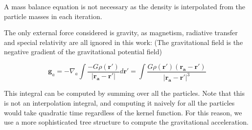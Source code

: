 \documentclass[../main.tex]{subfiles}
\begin{document}
A mass balance equation is not necessary as the density is interpolated from the particle masses in each iteration.

The only external force considered is gravity, as magnetism, radiative transfer and special relativity are all ignored in this work: (The gravitational field is the negative gradient of the gravitational potential field)

\begin{equation}
    \bm{g}_a = -\nabla_a\int\frac{-G\rho(\bm{r'})}{|\bm{r_a} - \bm{r'}|} d\bm{r}' = \int\frac{G\rho(\bm{r'})(\bm{r_a}-\bm{r'})}{|\bm{r_a}-\bm{r'}|^3}
\end{equation}

This integral can be computed by summing over all the particles. Note that this is not an interpolation integral, and computing it naively for all the particles would take quadratic time regardless of the kernel function. For this reason, we use a more sophisticated tree structure to compute the gravitational acceleration.
\end{document}

